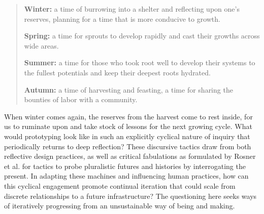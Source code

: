 \begin{quote}
  \noindent\textbf{Winter:} a time of burrowing into a shelter and reflecting upon one's reserves, planning for a time that is more conducive to growth.

  \noindent\textbf{Spring:} a time for sprouts to develop rapidly and cast their growths across wide areas. 

  \noindent\textbf{Summer:} a time for those who took root well to develop their systems to the fullest potentials and keep their deepest roots hydrated.

  \noindent\textbf{Autumn:} a time of harvesting and feasting, a time for sharing the bounties of labor with a community.
\end{quote}

When winter comes again, the reserves from the harvest come to rest inside, for us to ruminate upon and take stock of lessons for the next growing cycle. What would prototyping look like in such an explicitly cyclical nature of inquiry that periodically returns to deep reflection? 
These discursive tactics draw from both reflective design practices, as well as critical fabulations as formulated by Rosner et al. \cite{sengers_reflective_2005,rosner_critical_2018} for tactics to probe pluralistic futures and histories by interrogating the present. In adapting these machines and influencing human practices, how can this cyclical engagement promote continual iteration that could scale from discrete relationships to a future infrastructure? The questioning here seeks ways of iteratively progressing from an unsustainable way of being and making.


